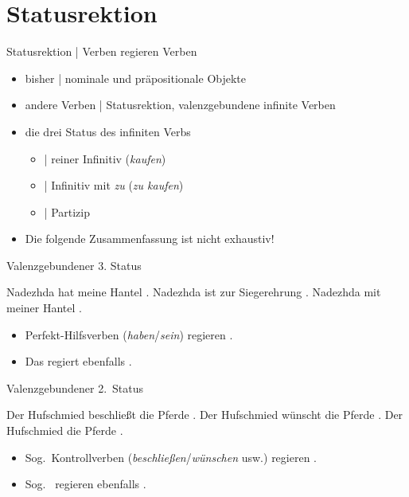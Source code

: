 \section{Statusrektion}

\begin{frame}
  {Statusrektion | Verben regieren Verben}
  \onslide<+->
  \begin{itemize}[<+->]
    \item bisher | \alert{nominale} und \alert{präpositionale} Objekte
    \item andere Verben | \alert{Statusrektion}, valenzgebundene infinite Verben
      \Zeile
    \item die drei Status des infiniten Verbs
      \begin{itemize}[<+->]
        \item {} | reiner Infinitiv (\textit{kaufen})
        \item {} | Infinitiv mit \textit{zu} (\textit{zu kaufen})
        \item {} | Partizip
      \end{itemize}
      \Zeile
    \item Die folgende Zusammenfassung ist nicht exhaustiv!
  \end{itemize}
\end{frame}

\begin{frame}
  {Valenzgebundener 3. Status}
  \onslide<+->
  \onslide<+->
  \begin{exe}
    \ex Nadezhda \alert{hat} meine Hantel .
    \ex Nadezhda \alert{ist} zur Siegerehrung .
    \Halbzeile
    \onslide<+->
    \ex Nadezhda  mit meiner Hantel .
  \end{exe}
  \Zeile
  \begin{itemize}[<+->]
    \item \alert{Perfekt-Hilfsverben (\textit{haben}\slash \textit{sein})} regieren .
    \item Das  regiert ebenfalls .
  \end{itemize}
\end{frame}


\begin{frame}
  {Valenzgebundener 2.~Status}
  \onslide<+->
  \onslide<+->
  \begin{exe}
    \ex Der Hufschmied \alert{beschließt} die Pferde .
    \ex Der Hufschmied \alert{wünscht} die Pferde .
    \Halbzeile
    \onslide<+->
    \ex Der Hufschmied  die Pferde .
  \end{exe}
  \begin{itemize}[<+->]
    \item Sog.\ \alert{Kontrollverben (\textit{beschließen}\slash \textit{wünschen} usw.)} regieren .
    \item Sog.\  regieren ebenfalls .
  \end{itemize}
\end{frame}

